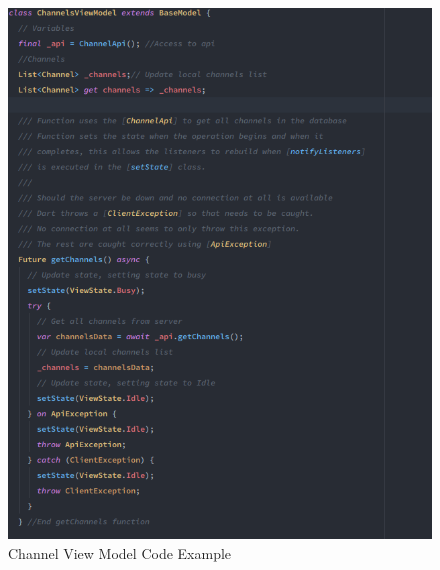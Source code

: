 \begin{figure}[h!]
    \caption{Channel View Model Code Example}
    \label{image:channelViewModel}
    \centering
    \includegraphics[width=1.0\textwidth]{images/channel_view_model_code.png}
\end{figure}

